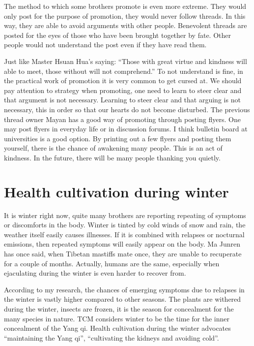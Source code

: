 \documentclass[
]{book}
\begin{document}
The method to which some brothers promote is even more extreme. They would only post for the purpose of promotion, they would never follow threads. In this way, they are able to avoid arguments with other people. Benevolent threads are posted for the eyes of those who have been brought together by fate. Other people would not understand the post even if they have read them.

Just like Master Hsuan Hua's saying: ``Those with great virtue and kindness will able to meet, those without will not comprehend.'' To not understand is fine, in the practical work of promotion it is very common to get cursed at. We should pay attention to strategy when promoting, one need to learn to steer clear and that argument is not necessary. Learning to steer clear and that arguing is not necessary, this in order so that our hearts do not become disturbed. The previous thread owner Mayan has a good way of promoting through posting flyers. One may post flyers in everyday life or in discussion forums. I think bulletin board at universities is a good option. By printing out a few flyers and posting them yourself, there is the chance of awakening many people. This is an act of kindness. In the future, there will be many people thanking you quietly.

\hypertarget{health-cultivation-during-winter}{%
\section{Health cultivation during winter}\label{health-cultivation-during-winter}}

It is winter right now, quite many brothers are reporting repeating of symptoms or discomforts in the body. Winter is tinted by cold winds of snow and rain, the weather itself easily causes illnesses. If it is combined with relapses or nocturnal emissions, then repeated symptoms will easily appear on the body. Ma Junren has once said, when Tibetan mastiffs mate once, they are unable to recuperate for a couple of months. Actually, humans are the same, especially when ejaculating during the winter is even harder to recover from.

According to my research, the chances of emerging symptoms due to relapses in the winter is vastly higher compared to other seasons. The plants are withered during the winter, insects are frozen, it is the season for concealment for the many species in nature. TCM considers winter to be the time for the inner concealment of the Yang qi. Health cultivation during the winter advocates ``maintaining the Yang qi'', ``cultivating the kidneys and avoiding cold''.
\end{document}
